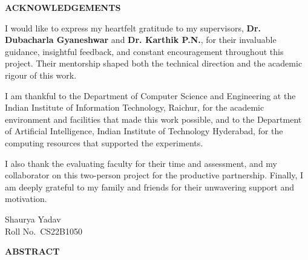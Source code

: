 \documentclass[12pt, a4paper, oneside]{report}
\newcommand{\studentName}{Shaurya Yadav}
\newcommand{\rollNumber}{CS22B1050}
\newcommand{\supervisorName}{Dr. Dubacharla Gyaneshwar}
\newcommand{\supervisorNameB}{Dr. Karthik P.N.}
\newcommand{\departmentName}{Computer Science and Engineering}
\newcommand{\frontmatterheading}[1]{%
  \begin{center}\Large\bfseries #1\end{center}
  \vspace{0.5cm}
}
\begin{document}
\clearpage
\thispagestyle{plain}
\frontmatterheading{ACKNOWLEDGEMENTS}

\noindent I would like to express my heartfelt gratitude to my supervisors,
\textbf{\supervisorName} and \textbf{\supervisorNameB}, for their invaluable
guidance, insightful feedback, and constant encouragement throughout this
project. Their mentorship shaped both the technical direction and the academic
rigour of this work.

\noindent I am thankful to the Department of \departmentName{} at the Indian
Institute of Information Technology, Raichur, for the academic environment and
facilities that made this work possible, and to the Department of Artificial
Intelligence, Indian Institute of Technology Hyderabad, for the computing
resources that supported the experiments.

\noindent I also thank the evaluating faculty for their time and assessment,
and my collaborator on this two-person project for the productive partnership.
Finally, I am deeply grateful to my family and friends for their unwavering
support and motivation.

\vspace{2cm}
\noindent
\begin{flushright}
\studentName \\
Roll No.~\rollNumber
\end{flushright}

\clearpage
\thispagestyle{plain}
\frontmatterheading{ABSTRACT}
\end{document}
